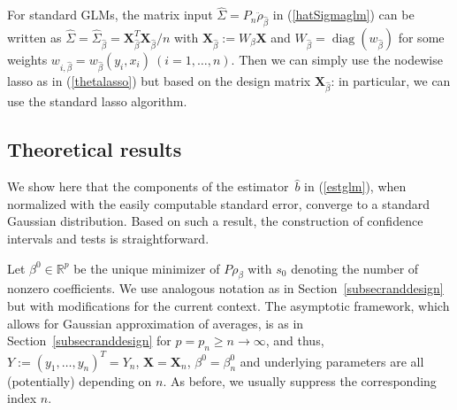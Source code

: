 \documentclass[aos,MSNbibl,dvips]{arximspdf}
\newcommand{\R}{\mathbb{R}}
\newcommand{\bx}{\mathbf{X}}
\begin{document}
For standard GLMs, the matrix input $\hat{\Sigma} = P_n \ddot
\rho_{\hat\beta}$ in (\ref{hatSigmaglm}) can be written
as $\hat{\Sigma} = \hat\Sigma_{\hat{\beta}} = \bx_{{\hat{\beta}}}^T
\bx_{{\hat{\beta}}}/n$ with $\bx_{{\hat{\beta}}}:= W_{\beta}
\bx
$ and $W_{\hat{\beta}} = \operatorname{diag}(w_{\hat{\beta}})$ for some weights
$w_{i,\hat{\beta}} = w_{\hat{\beta}} (y_i, x_i)\ (i=1,\ldots,n)$.
Then we
can simply use the nodewise lasso as in (\ref{thetalasso}) but based
on the
design matrix
$\bx_{{\hat{\beta}}}$: in particular, we can use the standard lasso
algorithm.

\subsection{Theoretical results}\label{subsectheoryGLM}

We show here that the components of the estimator~$\hat{b}$ in
(\ref{estglm}), when normalized with the easily computable standard error,
converge to a standard Gaussian distribution. Based on such a result,
the construction of confidence intervals and tests is straightforward.

Let $\beta^0 \in\R^p$ be the unique minimizer of $P
\rho_{\beta}$ with $s_0$ denoting the number of nonzero coefficients.
We use analogous notation as in Section~\ref{subsecranddesign} but with
modifications for the current context.
The asymptotic framework, which allows for Gaussian approximation of
averages, is as in Section~\ref{subsecranddesign} for $p = p_n \ge n
\to
\infty$, and thus, $Y:= (y_1,\ldots,y_n )^T= Y_n$, $\bx= \bx_n$,
$\beta^0 =
\beta^0_n$ and underlying parameters are all (potentially) depending on
$n$. As before, we usually suppress the corresponding index $n$.

\end{document}
